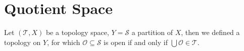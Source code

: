 \section{Quotient Space}
\begin{defi}
Let $(\mathcal{T}, X)$ be a topology space, $Y = \mathcal{S}$ a partition of $X$,
then we defined a topology on $Y$,
for which $\mathcal{O} \subseteq \mathcal{S}$ is open if and only if $\bigcup \mathcal{O} \in \mathcal{T}$.
\end{defi}
